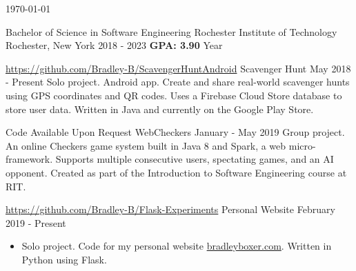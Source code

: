 \documentclass{awesome-cv}
\begin{document}
	\makecvheader[C]

	\makecvfooter
		{\today}
		{}
		{}


		\begin{cventries}
			\cventry
				{Bachelor of Science in Software Engineering}
				{Rochester Institute of Technology}
				{Rochester, New York}
				{2018 - 2023}
                {\textbf{GPA: 3.90}  Year}
		\end{cventries}

	\cvsection{PROJECTS}
		\begin{cventries}
			\cventry
				{\href{https://github.com/Bradley-B/ScavengerHuntAndroid}{https://github.com/Bradley-B/ScavengerHuntAndroid}}
				{Scavenger Hunt}
				{May 2018 - Present}
				{}
				{Solo project. Android app. Create and share real-world scavenger hunts using GPS coordinates and QR codes. Uses a Firebase Cloud Store database to store user data. Written in Java and currently on the Google Play Store.}

			\cventry
				{Code Available Upon Request}
				{WebCheckers}
				{January - May 2019}
				{}
				{Group project. An online Checkers game system built in Java 8 and Spark, a web micro-framework. Supports multiple consecutive users, spectating games, and an AI opponent. Created as part of the Introduction to Software Engineering course at RIT.}

            		\cventry
                		{\href{https://github.com/Bradley-B/Flask-Experiments}{https://github.com/Bradley-B/Flask-Experiments}}
                		{Personal Website}
                		{February 2019 - Present}
                		{}
                		{
						\vspace{-0.5cm}
						\begin{itemize}[nosep]
							\item Solo project. Code for my personal website \href{http://bradleyboxer.com}{bradleyboxer.com}. Written in Python using Flask.
						\end{itemize}
						\vspace{-0.5cm}
					}

		\end{cventries}
\end{document}
